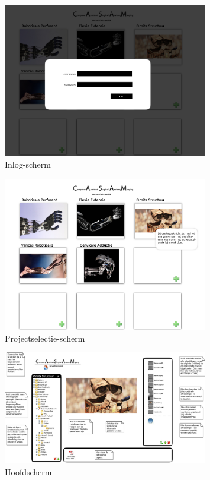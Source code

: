 \begin{figure}[htp]
\begin{center}
	\includegraphics[width=0.8\textwidth]{inlog}
\caption{Inlog-scherm}
\label{fig:inlog}
\end{center}
\end{figure}

\begin{figure}[htp]
\begin{center}
	\includegraphics[width=0.8\textwidth]{projectoverzicht}
\caption{Projectselectie-scherm}
\label{fig:projectoverzicht}
\end{center}
\end{figure}

\begin{figure}[htp]
\begin{center}
	\includegraphics[width=0.8\textwidth]{main_uitleg}
\caption{Hoofdscherm}
\label{fig:main_uitleg}
\end{center}
\end{figure}

